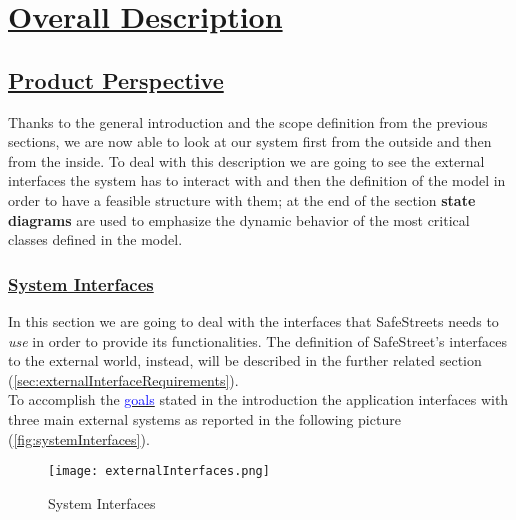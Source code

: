 \section[Overall Description]{\hyperlink{toc}{Overall Description}}
\label{sec:overallDescription}
\subsection[Product Perspective]{\hyperlink{toc}{Product Perspective}}
	Thanks to the general introduction and the scope definition from the previous sections, we are now able to look at our system first from the outside and then from the inside. To deal with this description we are going to see the external interfaces the system has to interact with and then the definition of the model in order to have a feasible structure with them; at the end of the section \textbf{state diagrams} are used to emphasize the dynamic behavior of the most critical classes defined in the model.
	\subsubsection[System Interfaces]{\hyperlink{toc}{System Interfaces}}
		\label{sec:systemInterfaces}
		In this section we are going to deal with the interfaces that SafeStreets needs to \emph{use} in order to provide its functionalities. The definition of SafeStreet's interfaces to the external world, instead, will be described in the further related section (\ref{sec:externalInterfaceRequirements}).\\
	
		To accomplish the \hyperref[sec:goals]{\textcolor{blue}{goals}} stated in the introduction the application interfaces with three main external systems as reported in the following picture (\autoref{fig:systemInterfaces}).  
		\vspace{0,3cm}
		
		\begin{figure}[h]
			\centering
			\texttt{[image: externalInterfaces.png]}
			\caption{\label{fig:systemInterfaces}System Interfaces}
		\end{figure}
		
